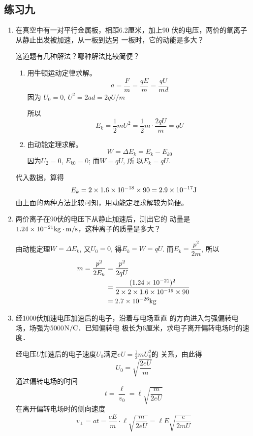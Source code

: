 \subsection{练习九}
\begin{enumerate}
	\item 在真空中有一对平行金属板，相距6.2厘米，加上90
伏的电压，两价的氧离子从静止出发被加速，从一板到达另
一板时，它的动能是多大？

这道题有几种解法？哪种解法比较简便？

\begin{solution}
\begin{enumerate}
    \item 用牛顿运动定律求解。
    \[a=\frac{F}{m}=\frac{qE}{m}=\frac{qU}{md}\]
    因为 $U_0=0$, $U^2=2ad=2qU/m$

    所以
    \[E_k=\frac{1}{2}mU^2=\frac{1}{2}m\cdot \frac{2qU}{m}=qU\]
    \item 由动能定理求解。
   \[ W=\Delta E_k=E_k-E_{k0}\]
   因为$U_2=0$, $E_{k0}=0$; 而$W=qU$, 所
    以$E_k=qU$. 
\end{enumerate}
代入数据，算得
    \[E_k=2\times1.6\times10^{-18}\times90=2.9\times10^{-17}{\rm J}\]
    由上面的两种方法比较可知，用动能定理求解较为简便。
\end{solution}

\item 两价离子在90伏的电压下从静止加速后，测出它的
动量是$1.24\times10^{-21}{\rm kg}\cdot \text{m}/\text{s}$，这种离子的质量是多大？


\begin{solution}
    由动能定理$W=\Delta E_k$, 又$U_0=0$, 得$E_k=W=qU$.
    而$E_k=\dfrac{p^2}{2m}$, 所以
 \[\begin{split}
     m=\frac{p^2}{2E_k}&=\frac{p^2}{2qU}\\
     &=\frac{(1.24\times10^{-21})^2}{2\times 2\times1.6\times10^{-19}\times 90}\\
     &=2.7\times10^{-26}{\rm kg}
 \end{split}\]   
\end{solution}

\item 经1000伏加速电压加速后的电子，沿着与电场垂直
的方向进入匀强偏转电场，场强为5000$\text{N}/\text{C}$．已知偏转电
极长为6厘米，求电子离开偏转电场时的速度．

\begin{solution}
    经电压$U$加速后的电子速度$U_0$满足$eU=\frac{1}{2}mU^2_0$的
    关系，由此得
 \[   U_0=\sqrt{\frac{2eU}{m}}\]
    通过偏转电场的时间
    \[t=\frac{\ell}{v_0}=\ell\sqrt{\frac{m}{2eU}}\]
    在离开偏转电场时的侧向速度
\[    v_{\bot}=at=\frac{eE}{m}\cdot \ell\sqrt{\frac{m}{2eU}}=\ell E\sqrt{\frac{e}{2mU}}\]


\end{solution}
\end{enumerate}

